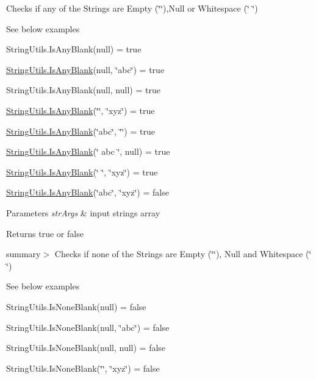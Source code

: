 Checks if any of the Strings are Empty (\char`\"{}\char`\"{}),Null or Whitespace (\char`\"{} \char`\"{}) 

See below examples 

String\+Utils.\+Is\+Any\+Blank(null) = true 

\hyperlink{class_ultimate_1_1_utilities_1_1_string_utils_a4be7e4afbf21aad56e5af0097b2ce524}{String\+Utils.\+Is\+Any\+Blank}(null, \char`\"{}abc\char`\"{}) = true 

String\+Utils.\+Is\+Any\+Blank(null, null) = true 

\hyperlink{class_ultimate_1_1_utilities_1_1_string_utils_a4be7e4afbf21aad56e5af0097b2ce524}{String\+Utils.\+Is\+Any\+Blank}(\char`\"{}\char`\"{}, \char`\"{}xyz\char`\"{}) = true 

\hyperlink{class_ultimate_1_1_utilities_1_1_string_utils_a4be7e4afbf21aad56e5af0097b2ce524}{String\+Utils.\+Is\+Any\+Blank}(\char`\"{}abc\char`\"{}, \char`\"{}\char`\"{}) = true 

\hyperlink{class_ultimate_1_1_utilities_1_1_string_utils_a4be7e4afbf21aad56e5af0097b2ce524}{String\+Utils.\+Is\+Any\+Blank}(\char`\"{}  abc  \char`\"{}, null) = true 

\hyperlink{class_ultimate_1_1_utilities_1_1_string_utils_a4be7e4afbf21aad56e5af0097b2ce524}{String\+Utils.\+Is\+Any\+Blank}(\char`\"{} \char`\"{}, \char`\"{}xyz\char`\"{}) = true 

\hyperlink{class_ultimate_1_1_utilities_1_1_string_utils_a4be7e4afbf21aad56e5af0097b2ce524}{String\+Utils.\+Is\+Any\+Blank}(\char`\"{}abc\char`\"{}, \char`\"{}xyz\char`\"{}) = false 


\begin{DoxyParams}{Parameters}
{\em str\+Args} & input strings array\\
\hline
\end{DoxyParams}
\begin{DoxyReturn}{Returns}
true or false
\end{DoxyReturn}
summary$>$ Checks if none of the Strings are Empty (\char`\"{}\char`\"{}), Null and Whitespace (\char`\"{} \char`\"{}) 

See below examples 

String\+Utils.\+Is\+None\+Blank(null) = false 

String\+Utils.\+Is\+None\+Blank(null, \char`\"{}abc\char`\"{}) = false 

String\+Utils.\+Is\+None\+Blank(null, null) = false 

String\+Utils.\+Is\+None\+Blank(\char`\"{}\char`\"{}, \char`\"{}xyz\char`\"{}) = false 

